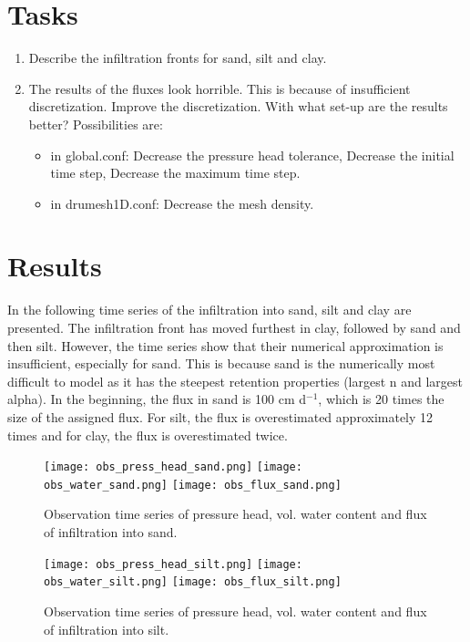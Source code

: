\documentclass[
10pt, %
a4paper, %
oneside, %
headinclude,footinclude, %
BCOR5mm, %
]{scrartcl}
\begin{document}
\section*{Tasks}

\begin{enumerate}
\item Describe the infiltration fronts for sand, silt and clay.
\item The results of the fluxes look horrible. This is because of insufficient discretization. Improve the discretization. With what set-up are the results better? Possibilities are: 
\begin{itemize}
\item in global.conf: Decrease the pressure head tolerance, Decrease the initial time step, Decrease the maximum time step.
\item in drumesh1D.conf: Decrease the mesh density. 
\end{itemize}
\end{enumerate}



\section*{Results}
In the following time series of the infiltration into sand, silt and clay are presented. The infiltration front has moved furthest in clay, followed by sand and then silt. However, the time series show that their numerical approximation is insufficient, especially for sand. This is because sand is the numerically most difficult to model as it has the steepest retention properties (largest n and largest alpha). In the beginning, the flux in sand is 100 cm d$^{-1}$, which is 20 times the size of the assigned flux. For silt, the flux is overestimated approximately 12 times and for clay, the flux is overestimated twice. 

\begin{figure}
\centering
\texttt{[image: obs\_press\_head\_sand.png]}
\texttt{[image: obs\_water\_sand.png]}
\texttt{[image: obs\_flux\_sand.png]}
\caption{Observation time series of pressure head, vol. water content and flux of infiltration into sand.}
\end{figure}

\begin{figure}
\centering
\texttt{[image: obs\_press\_head\_silt.png]}
\texttt{[image: obs\_water\_silt.png]}
\texttt{[image: obs\_flux\_silt.png]}
\caption{Observation time series of pressure head, vol. water content and flux of infiltration into silt.}

\end{figure}
\end{document}

